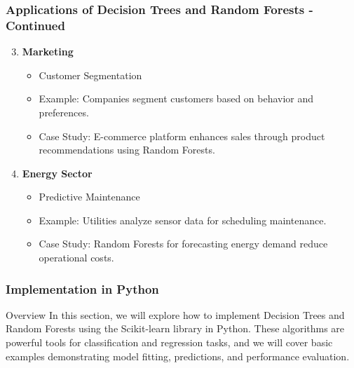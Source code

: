 \documentclass[aspectratio=169]{beamer}
\begin{document}
\begin{frame}[fragile]
    \frametitle{Applications of Decision Trees and Random Forests - Continued}
    \begin{enumerate}
        \setcounter{enumi}{2}
        \item \textbf{Marketing}
        \begin{itemize}
            \item Customer Segmentation
            \item Example: Companies segment customers based on behavior and preferences.
            \item Case Study: E-commerce platform enhances sales through product recommendations using Random Forests.
        \end{itemize}

        \item \textbf{Energy Sector}
        \begin{itemize}
            \item Predictive Maintenance
            \item Example: Utilities analyze sensor data for scheduling maintenance.
            \item Case Study: Random Forests for forecasting energy demand reduce operational costs.
        \end{itemize}
    \end{enumerate}
\end{frame}

\begin{frame}
    \frametitle{Implementation in Python}
    \begin{block}{Overview}
        In this section, we will explore how to implement Decision Trees and Random Forests using the Scikit-learn library in Python. 
        These algorithms are powerful tools for classification and regression tasks, and we will cover basic examples demonstrating model fitting, predictions, and performance evaluation.
    \end{block}
\end{frame}
\end{document}
